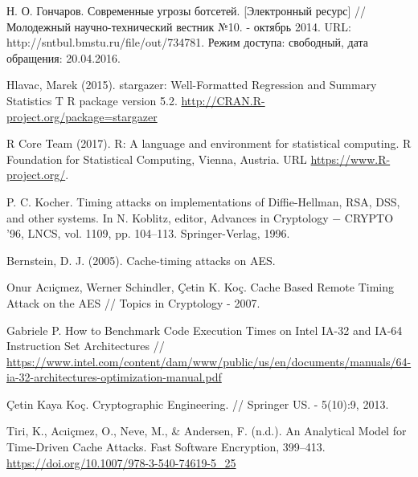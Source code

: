 \begingroup
\renewcommand{\section}[2]{\anonsection{Библиографический список}}
\begin{thebibliography}{00}

    Н. О. Гончаров.
    Современные угрозы ботсетей. [Электронный ресурс] // Молодежный научно-технический вестник №10. - октябрь 2014.
    URL: http://sntbul.bmstu.ru/file/out/734781.
    Режим доступа: свободный, дата обращения: 20.04.2016.

  Hlavac, Marek (2015). stargazer: Well-Formatted Regression and Summary Statistics T
  R package version 5.2. \url{http://CRAN.R-project.org/package=stargazer}

  R Core Team (2017). R: A language and environment for statistical
  computing. R Foundation for Statistical Computing, Vienna, Austria.
  URL \url{https://www.R-project.org/}.

  P. C. Kocher. Timing attacks on implementations of Diffie-Hellman, RSA,
  DSS, and other systems. In N. Koblitz, editor, Advances in Cryptology −
  CRYPTO ’96, LNCS, vol. 1109, pp. 104–113. Springer-Verlag, 1996.

  Bernstein, D. J. (2005). Cache-timing attacks on AES.

  Onur Acıiçmez, Werner Schindler, Çetin K. Koç.
  Cache Based Remote Timing Attack on the AES //
  Topics in Cryptology - 2007.

  Gabriele P. How to Benchmark Code Execution Times on Intel IA-32 and IA-64 Instruction Set Architectures //
  \url{https://www.intel.com/content/dam/www/public/us/en/documents/manuals/64-ia-32-architectures-optimization-manual.pdf}

  Çetin Kaya Koç.
  Cryptographic Engineering. //
  Springer US. - 5(10):9, 2013.

  Tiri, K., Acıiçmez, O., Neve, M., \& Andersen, F. (n.d.).
  An Analytical Model for Time-Driven Cache Attacks.
  Fast Software Encryption, 399–413. \url{https://doi.org/10.1007/978-3-540-74619-5_25}



\end{thebibliography}
\endgroup

\clearpage
